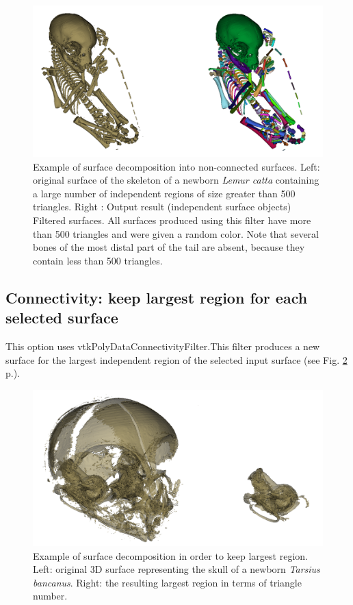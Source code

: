 \begin{figure}
  \centering
  \includegraphics[scale=0.35]{images/09/structure/surface_decomposition_example.png} 
	\caption{Example of surface decomposition into non-connected surfaces. Left: original surface of the skeleton of a newborn \textit{Lemur catta} containing a large number of independent regions of size greater than 500 triangles. Right : Output result (independent surface objects) Filtered surfaces. All surfaces produced using this filter have more than 500 triangles and were given a random color. Note that several bones of the most distal part of the tail are absent, because they contain less than 500 triangles. }
\label{decompose34}
 
\end{figure}






\subsection{Connectivity: keep largest region for each selected surface}
This option uses vtkPolyDataConnectivityFilter.This filter produces a new surface for the largest independent region of the selected input surface (see Fig. \ref{largest_region} p.\pageref{largest_region}).

\begin{figure}
  \centering
  \includegraphics[scale=0.31]{images/09/structure/keep_largest.png} 
	\caption{Example of surface decomposition in order to keep largest region. Left: original 3D surface representing the skull of a newborn \textit{Tarsius bancanus}. Right: the resulting largest region in terms of triangle number.}
\label{largest_region}
 
\end{figure}


